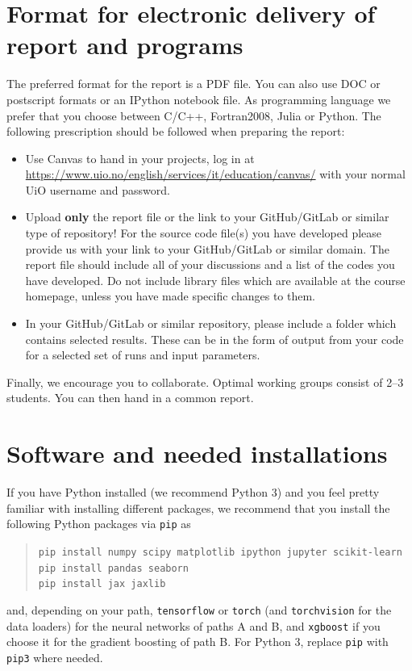 \documentclass[11pt,a4paper]{article}
\begin{document}
\section*{Format for electronic delivery of report and programs}

The preferred format for the report is a PDF file.  You can also use DOC or
postscript formats or an IPython notebook file.  As programming language we
prefer that you choose between C/C++, Fortran2008, Julia or Python.  The
following prescription should be followed when preparing the report:
\begin{itemize}[nosep]
  \item Use Canvas to hand in your projects, log in at
        \url{https://www.uio.no/english/services/it/education/canvas/} with
        your normal UiO username and password.
  \item Upload \textbf{only} the report file or the link to your GitHub/GitLab
        or similar type of repository!  For the source code file(s) you have
        developed please provide us with your link to your GitHub/GitLab or
        similar domain.  The report file should include all of your
        discussions and a list of the codes you have developed.  Do not
        include library files which are available at the course homepage,
        unless you have made specific changes to them.
  \item In your GitHub/GitLab or similar repository, please include a folder
        which contains selected results.  These can be in the form of output
        from your code for a selected set of runs and input parameters.
\end{itemize}
Finally, we encourage you to collaborate.  Optimal working groups consist of
2--3 students.  You can then hand in a common report.

\section*{Software and needed installations}

If you have Python installed (we recommend Python 3) and you feel pretty
familiar with installing different packages, we recommend that you install
the following Python packages via \texttt{pip} as
\begin{quote}\small
\texttt{pip install numpy scipy matplotlib ipython jupyter scikit-learn}\\
\texttt{pip install pandas seaborn}\\
\texttt{pip install jax jaxlib}
\end{quote}
and, depending on your path, \texttt{tensorflow} or \texttt{torch} (and
\texttt{torchvision} for the data loaders) for the neural networks of paths
A and B, and \texttt{xgboost} if you choose it for the gradient boosting of
path B.  For Python 3, replace \texttt{pip} with \texttt{pip3} where needed.
\end{document}
